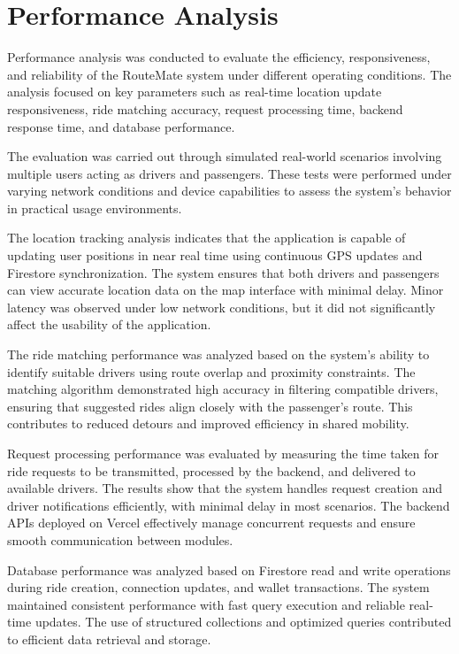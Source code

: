 \documentclass[10pt,a4paper]{report}
\begin{document}
\section{Performance Analysis}

\justify\large Performance analysis was conducted to evaluate the efficiency, responsiveness, and reliability of the RouteMate system under different operating conditions. The analysis focused on key parameters such as real-time location update responsiveness, ride matching accuracy, request processing time, backend response time, and database performance.

\justify\large The evaluation was carried out through simulated real-world scenarios involving multiple users acting as drivers and passengers. These tests were performed under varying network conditions and device capabilities to assess the system’s behavior in practical usage environments.

\justify\large The location tracking analysis indicates that the application is capable of updating user positions in near real time using continuous GPS updates and Firestore synchronization. The system ensures that both drivers and passengers can view accurate location data on the map interface with minimal delay. Minor latency was observed under low network conditions, but it did not significantly affect the usability of the application.

\justify\large The ride matching performance was analyzed based on the system’s ability to identify suitable drivers using route overlap and proximity constraints. The matching algorithm demonstrated high accuracy in filtering compatible drivers, ensuring that suggested rides align closely with the passenger’s route. This contributes to reduced detours and improved efficiency in shared mobility.

\justify\large Request processing performance was evaluated by measuring the time taken for ride requests to be transmitted, processed by the backend, and delivered to available drivers. The results show that the system handles request creation and driver notifications efficiently, with minimal delay in most scenarios. The backend APIs deployed on Vercel effectively manage concurrent requests and ensure smooth communication between modules.

\justify\large Database performance was analyzed based on Firestore read and write operations during ride creation, connection updates, and wallet transactions. The system maintained consistent performance with fast query execution and reliable real-time updates. The use of structured collections and optimized queries contributed to efficient data retrieval and storage.
\end{document}
